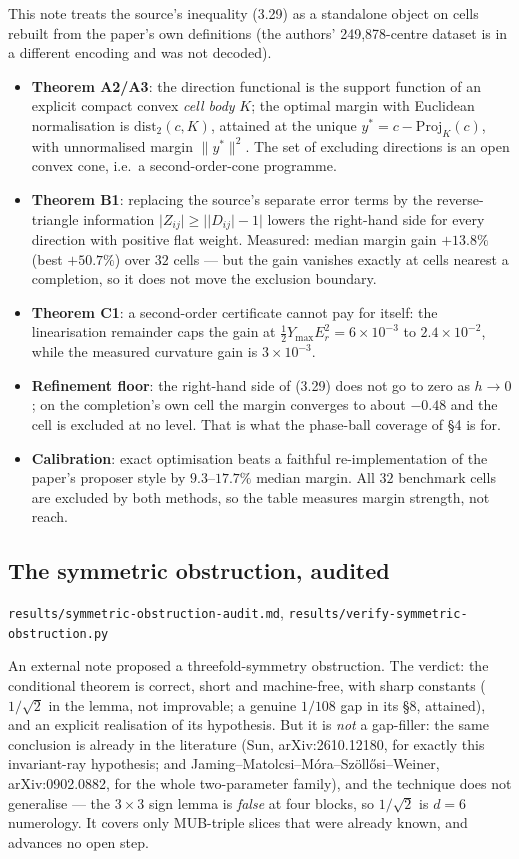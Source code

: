 \documentclass[10pt]{article}
\theoremstyle{definition}
\newcommand{\abs}[1]{\lvert #1\rvert}
\newcommand{\norm}[1]{\lVert #1\rVert}
\newcommand{\file}[1]{\texttt{\small #1}}
\begin{document}
This note treats the source's inequality (3.29) as a standalone object on cells rebuilt from the
paper's own definitions (the authors' 249,878-centre dataset is in a different encoding and was not
decoded).
\begin{itemize}[leftmargin=1.2em,itemsep=1pt]
\item \textbf{Theorem A2/A3}: the direction functional is the support function of an explicit compact
convex \emph{cell body} $K$; the optimal margin with Euclidean normalisation is $\mathrm{dist}_2(c,K)$,
attained at the unique $y^*=c-\mathrm{Proj}_K(c)$, with unnormalised margin $\norm{y^*}^2$. The set of
excluding directions is an open convex cone, i.e.\ a second-order-cone programme.
\item \textbf{Theorem B1}: replacing the source's separate error terms by the reverse-triangle
information $\abs{Z_{ij}}\ge\abs{\abs{D_{ij}}-1}$ lowers the right-hand side for every direction with
positive flat weight. Measured: median margin gain $+13.8\%$ (best $+50.7\%$) over $32$ cells --- but
the gain vanishes exactly at cells nearest a completion, so it does not move the exclusion boundary.
\item \textbf{Theorem C1}: a second-order certificate cannot pay for itself: the linearisation
remainder caps the gain at $\tfrac12Y_{\max}E_r^2=6\times10^{-3}$ to $2.4\times10^{-2}$, while the
measured curvature gain is $3\times10^{-3}$.
\item \textbf{Refinement floor}: the right-hand side of (3.29) does not go to zero as $h\to0$; on the
completion's own cell the margin converges to about $-0.48$ and the cell is excluded at no level. That
is what the phase-ball coverage of \S4 is for.
\item \textbf{Calibration}: exact optimisation beats a faithful re-implementation of the paper's
proposer style by $9.3$--$17.7\%$ median margin. All $32$ benchmark cells are excluded by both
methods, so the table measures margin strength, not reach.
\end{itemize}

\subsection{The symmetric obstruction, audited}
\file{results/\allowbreak{}symmetric-\allowbreak{}obstruction-\allowbreak{}audit.md}, \file{results/\allowbreak{}verify-\allowbreak{}symmetric-\allowbreak{}obstruction.py}

An external note proposed a threefold-symmetry obstruction. The verdict: the conditional theorem is
correct, short and machine-free, with sharp constants ($1/\sqrt2$ in the lemma, not improvable; a
genuine $1/108$ gap in its \S8, attained), and an explicit realisation of its hypothesis. But it is
\emph{not} a gap-filler: the same conclusion is already in the literature (Sun, arXiv:2610.12180, for
exactly this invariant-ray hypothesis; and Jaming--Matolcsi--M\'ora--Sz\"oll\H{o}si--Weiner,
arXiv:0902.0882, for the whole two-parameter family), and the technique does not generalise --- the
$3\times3$ sign lemma is \emph{false} at four blocks, so $1/\sqrt2$ is $d=6$ numerology. It covers only
MUB-triple slices that were already known, and advances no open step.
\end{document}
